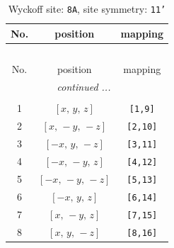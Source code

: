 \documentclass[fleqn,8pt]{jsarticle}
\begin{document}
\renewcommand{\arraystretch}{1.2}
\begin{longtable}{ccc}
\caption{Wyckoff site: {\tt 8A}, site symmetry: {\tt 11'}}
 \\
 \hline \hline
No. & position & mapping \\ \hline \endfirsthead

\multicolumn{2}{l}{\tablename\ \thetable{}} \\
 \hline \hline
No. & position & mapping \\ \hline \endhead

 \hline \hline
\multicolumn{2}{r}{\footnotesize\it continued ...} \\ \endfoot

 \hline \hline
\multicolumn{2}{r}{} \\ \endlastfoot

1 & $\left[ x,\, y,\, z \right]$ & {\tt [1,9]} \\ \hline
2 & $\left[ x,\, - y,\, - z \right]$ & {\tt [2,10]} \\ \hline
3 & $\left[ - x,\, y,\, - z \right]$ & {\tt [3,11]} \\ \hline
4 & $\left[ - x,\, - y,\, z \right]$ & {\tt [4,12]} \\ \hline
5 & $\left[ - x,\, - y,\, - z \right]$ & {\tt [5,13]} \\ \hline
6 & $\left[ - x,\, y,\, z \right]$ & {\tt [6,14]} \\ \hline
7 & $\left[ x,\, - y,\, z \right]$ & {\tt [7,15]} \\ \hline
8 & $\left[ x,\, y,\, - z \right]$ & {\tt [8,16]} \\
\end{longtable}
\end{document}
